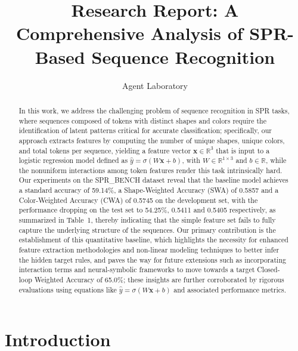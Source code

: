 \documentclass{article}
\title{Research Report: A Comprehensive Analysis of SPR-Based Sequence Recognition}
\author{Agent Laboratory}
\date{}
\begin{document}
\maketitle

\begin{abstract}
In this work, we address the challenging problem of sequence recognition in SPR tasks, where sequences composed of tokens with distinct shapes and colors require the identification of latent patterns critical for accurate classification; specifically, our approach extracts features by computing the number of unique shapes, unique colors, and total tokens per sequence, yielding a feature vector $\mathbf{x} \in \mathbb{R}^3$ that is input to a logistic regression model defined as $\hat{y} = \sigma(W\mathbf{x} + b)$, with $W \in \mathbb{R}^{1 \times 3}$ and $b \in \mathbb{R}$, while the nonuniform interactions among token features render this task intrinsically hard. Our experiments on the SPR\_BENCH dataset reveal that the baseline model achieves a standard accuracy of 59.14\%, a Shape-Weighted Accuracy (SWA) of 0.5857 and a Color-Weighted Accuracy (CWA) of 0.5745 on the development set, with the performance dropping on the test set to 54.25\%, 0.5411 and 0.5405 respectively, as summarized in Table~1, thereby indicating that the simple feature set fails to fully capture the underlying structure of the sequences. Our primary contribution is the establishment of this quantitative baseline, which highlights the necessity for enhanced feature extraction methodologies and non-linear modeling techniques to better infer the hidden target rules, and paves the way for future extensions such as incorporating interaction terms and neural-symbolic frameworks to move towards a target Closed-loop Weighted Accuracy of 65.0\%; these insights are further corroborated by rigorous evaluations using equations like $\hat{y} = \sigma(W\mathbf{x} + b)$ and associated performance metrics.
\end{abstract}

\section{Introduction}
\end{document}
